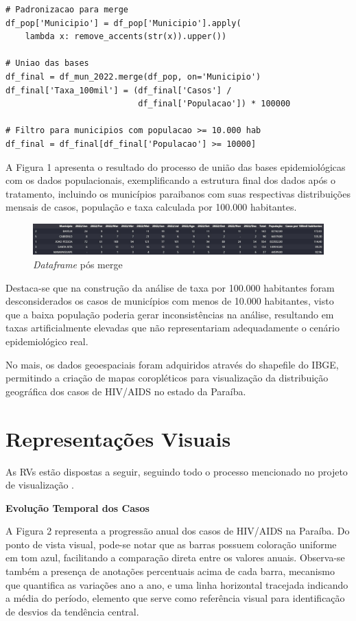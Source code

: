 \documentclass[10pt,a4paper]{article}
\begin{document}
\begin{multicols}{2}
\begin{lstlisting}
# Padronizacao para merge
df_pop['Municipio'] = df_pop['Municipio'].apply(
    lambda x: remove_accents(str(x)).upper())

# Uniao das bases
df_final = df_mun_2022.merge(df_pop, on='Municipio')
df_final['Taxa_100mil'] = (df_final['Casos'] / 
                           df_final['Populacao']) * 100000

# Filtro para municipios com populacao >= 10.000 hab
df_final = df_final[df_final['Populacao'] >= 10000]
\end{lstlisting}

A Figura 1 apresenta o resultado do processo de união das bases epidemiológicas com os dados populacionais, exemplificando a estrutura final dos dados após o tratamento, incluindo os municípios paraibanos com suas respectivas distribuições mensais de casos, população e taxa calculada por 100.000 habitantes.

\begin{figure}[H]
    \centering
    \includegraphics[width=\linewidth]{merged_dataset.jpeg}
    \caption{\textit{Dataframe} pós merge}
    \label{fig:dataframe_merge}
\end{figure}

Destaca-se que na construção da análise de taxa por 100.000 habitantes foram desconsiderados os casos de municípios com menos de 10.000 habitantes, visto que a baixa população poderia gerar inconsistências na análise, resultando em taxas artificialmente elevadas que não representariam adequadamente o cenário epidemiológico real.

No mais, os dados geoespaciais foram adquiridos através do shapefile do IBGE, permitindo a criação de mapas coropléticos para visualização da distribuição geográfica dos casos de HIV/AIDS no estado da Paraíba.

\section{Representações Visuais}

As RVs estão dispostas a seguir, seguindo todo o processo mencionado no projeto de visualização .

\textbf{Evolução Temporal dos Casos}

A Figura 2 representa a progressão anual dos casos de HIV/AIDS na Paraíba. Do ponto de vista visual, pode-se notar que as barras possuem coloração uniforme em tom azul, facilitando a comparação direta entre os valores anuais. Observa-se também a presença de anotações percentuais acima de cada barra, mecanismo que quantifica as variações ano a ano, e uma linha horizontal tracejada indicando a média do período, elemento que serve como referência visual para identificação de desvios da tendência central.


\end{multicols}
\end{document}
